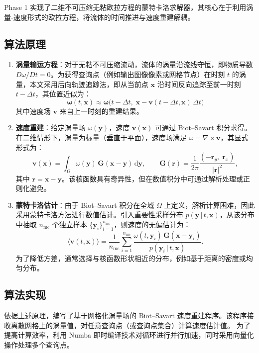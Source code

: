 \documentclass[UTF8,fontset=fandol]{ctexart}
\begin{document}
Phase 1 实现了二维不可压缩无粘欧拉方程的蒙特卡洛求解器，其核心在于利用涡量-速度形式的欧拉方程，将流体的时间推进与速度重建解耦。
\subsection{算法原理}
\begin{enumerate}
    \item \textbf{涡量输运方程}：对于无粘不可压缩流动，流体的涡量沿流线守恒，即物质导数 $D\omega/Dt = 0$。为获得查询点（例如输出图像像素或网格节点）在时刻 $t$ 的涡量，本文采用后向轨迹追踪法，即从当前点 $\mathbf{x}$ 沿时间反向追踪至前一时刻 $t-\Delta t$，其位置近似为：
    \[
    \boldsymbol{\omega}(t, \mathbf{x}) \approx \boldsymbol{\omega}\bigl(t - \Delta t,\; \mathbf{x} - \mathbf{v}(t - \Delta t, \mathbf{x})\,\Delta t\bigr)
    \]
    其中速度场 $\mathbf{v}$ 来自上一时刻的重建结果。

    \item \textbf{速度重建}：给定涡量场 $\omega(\mathbf{y})$，速度 $\mathbf{v}(\mathbf{x})$ 可通过 Biot–Savart 积分求得。在二维情形下，涡量为标量（垂直于平面），速度场满足 $\omega = \nabla \times \mathbf{v}$，其显式形式为：
    \[
    \mathbf{v}(\mathbf{x}) = \int_{\Omega} \omega(\mathbf{y})\, \mathbf{G}(\mathbf{x} - \mathbf{y})\, \mathrm{d}\mathbf{y},
    \qquad 
    \mathbf{G}(\mathbf{r}) = \frac{1}{2\pi}\frac{(-\mathbf{r}_y,\; \mathbf{r}_x)}{|\mathbf{r}|^2},
    \]
    其中 $\mathbf{r} = \mathbf{x} - \mathbf{y}$。该核函数具有奇异性，但在数值积分中可通过解析处理或正则化避免。

    \item \textbf{蒙特卡洛估计}：由于 Biot–Savart 积分在全域 $\Omega$ 上定义，解析计算困难，因此采用蒙特卡洛方法进行数值估计。引入重要性采样分布 $p(\mathbf{y}\,|\,t,\mathbf{x})$，从该分布中抽取 $n_{\mathrm{mc}}$ 个独立样本 $\{\mathbf{y}_i\}_{i=1}^{n_{\mathrm{mc}}}$，则速度的无偏估计为：
    \[
    \langle \mathbf{v}(t, \mathbf{x}) \rangle = \frac{1}{n_{\mathrm{mc}}} \sum_{i=1}^{n_{\mathrm{mc}}} 
    \frac{\omega(t, \mathbf{y}_i)\, \mathbf{G}(\mathbf{x} - \mathbf{y}_i)}{p(\mathbf{y}_i\,|\,t,\mathbf{x})}.
    \]
    为了降低方差，通常选择与核函数形状相近的分布，例如基于距离的密度或均匀分布。
\end{enumerate}

\subsection{算法实现}

依据上述原理，编写了基于网格化涡量场的 Biot–Savart 速度重建程序。该程序接收离散网格上的涡量值，对任意查询点（或查询点集合）计算速度估计值。
为了提高计算效率，利用 Numba 即时编译技术对循环进行并行加速，同时采用向量化操作处理多个查询点。
\end{document}
